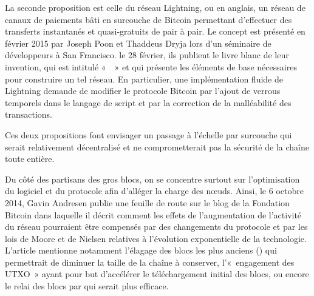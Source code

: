 
La seconde proposition est celle du réseau Lightning, ou  en anglais, un réseau de canaux de paiements bâti en surcouche de Bitcoin permettant d'effectuer des transferts instantanés et quasi-gratuits de pair à pair. Le concept est présenté en février 2015 par Joseph Poon et Thaddeus Dryja lors d'un séminaire de développeurs à San Francisco. le 28 février, ils publient le livre blanc de leur invention, qui est intitulé «~~» et qui présente les éléments de base nécessaires pour construire un tel réseau. En particulier, une implémentation fluide de Lightning demande de modifier le protocole Bitcoin par l'ajout de verrous temporels dans le langage de script et par la correction de la malléabilité des transactions.

Ces deux propositions font envisager un passage à l'échelle par surcouche qui serait relativement décentralisé et ne comprometterait pas la sécurité de la chaîne toute entière.

Du côté des partisans des gros blocs, on se concentre surtout sur l'optimisation du logiciel et du protocole afin d'alléger la charge des nœuds. Ainsi, le 6 octobre 2014, Gavin Andresen publie une feuille de route sur le blog de la Fondation Bitcoin dans laquelle il décrit comment les effets de l'augmentation de l'activité du réseau pourraient être compensés par des changements du protocole et par les lois de Moore et de Nielsen relatives à l'évolution exponentielle de la technologie. L'article mentionne notamment l'élagage des blocs les plus anciens () qui permettrait de diminuer la taille de la chaîne à conserver, l'«~engagement des UTXO~» ayant pour but d'accélérer le téléchargement initial des blocs, ou encore le relai des blocs par  qui serait plus efficace.

